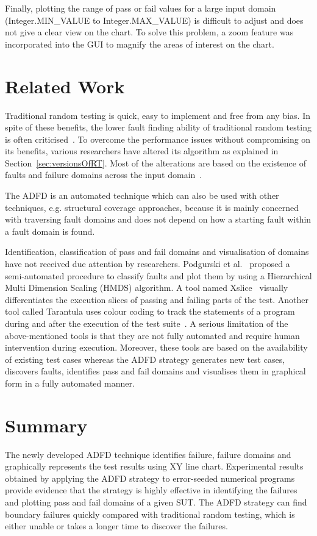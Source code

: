 Finally, plotting the range of pass or fail values for a large input domain (Integer.MIN\_VALUE to Integer.MAX\_VALUE) is difficult to adjust and does not give a clear view on the chart. To solve this problem, a zoom feature was incorporated into the GUI to magnify the areas of interest on the chart.



\section{Related Work} \label{sec:relatedWork}
Traditional random testing is quick, easy to implement and free from any bias. In spite of these benefits, the lower fault finding ability of traditional random testing is often criticised~\cite{myers2011art, offutt1996semantic}. To overcome the performance issues without compromising on its benefits, various researchers have altered its algorithm as explained in Section~\ref{sec:versionsOfRT}. Most of the alterations are based on the existence of faults and failure domains across the input domain~\cite{chan1996proportional}. 

The ADFD is an automated technique which can also be used with other techniques, e.g. structural coverage approaches, because it is mainly concerned with traversing fault domains and does not depend on how a starting fault within a fault domain is found.

Identification, classification of pass and fail domains and visualisation of domains have not received due attention by researchers. Podgurski et al.~\cite{podgurski2003automated} proposed a semi-automated procedure to classify faults and plot them by using a Hierarchical Multi Dimension Scaling (HMDS) algorithm. A tool named Xslice~\cite{agrawal1995fault} visually differentiates the execution slices of passing and failing parts of the test. Another tool called Tarantula uses colour coding to track the statements of a program during and after the execution of the test suite~\cite{jones2002visualization}. A serious limitation of the above-mentioned tools is that they are not fully automated and require human intervention during execution. Moreover, these tools are based on the availability of existing test cases whereas the ADFD strategy generates new test cases, discovers faults, identifies pass and fail domains and visualises them in graphical form in a fully automated manner. 


\section{Summary} \label{sec:conclusion}
The newly developed ADFD technique identifies failure, failure domains and graphically represents the test results using XY line chart. Experimental results obtained by applying the ADFD strategy to error-seeded numerical programs provide evidence that the strategy is highly effective in identifying the failures and plotting pass and fail domains of a given SUT. The ADFD strategy can find boundary failures quickly compared with traditional random testing, which is either unable or takes a longer time to discover the failures.

